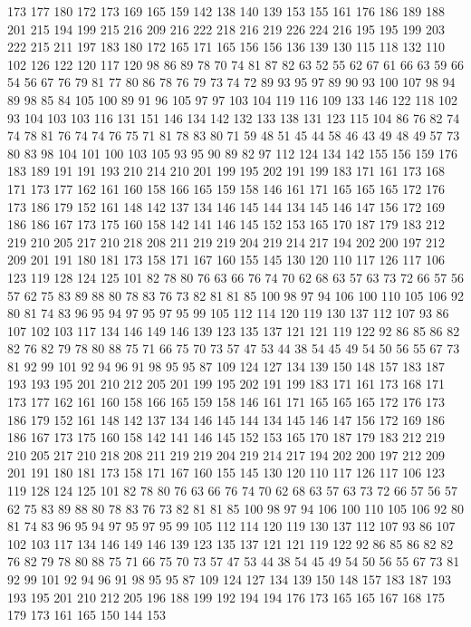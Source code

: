 173 177 180 172 173 169 165 159 142 138 140 139 153 155 161 176 186 189 188 201
215 194 199 215 216 209 216 222 218 216 219 226 224 216 195 195 199 203 222 215
211 197 183 180 172 165 171 165 156 156 136 139 130 115 118 132 110 102 126 122
120 117 120 98 86 89 78 70 74 81 87 82 63 52 55 62 67 61 66 63
59 66 54 56 67 76 79 81 77 80 86 78 76 79 73 74 72 89 93 95
97 89 90 93 100 107 98 94 89 98 85 84 105 100 89 91 96 105 97 97
103 104 119 116 109 133 146 122 118 102 93 104 103 103 116 131 151 146 134 142
132 133 138 131 123 115 104 86 76 82 74 74 78 81 76 74 74 76 75 71
81 78 83 80 71 59 48 51 45 44 58 46 43 49 48 49 57 73 80 83
98 104 101 100 103 105 93 95 90 89 82 97 112 124 134 142 155 156 159 176
183 189 191 191 193 210 214 210 201 199 195 202 191 199 183 171 161 173 168 171
173 177 162 161 160 158 166 165 159 158 146 161 171 165 165 165 172 176 173 186
179 152 161 148 142 137 134 146 145 144 134 145 146 147 156 172 169 186 186 167
173 175 160 158 142 141 146 145 152 153 165 170 187 179 183 212 219 210 205 217
210 218 208 211 219 219 204 219 214 217 194 202 200 197 212 209 201 191 180 181
173 158 171 167 160 155 145 130 120 110 117 126 117 106 123 119 128 124 125 101
82 78 80 76 63 66 76 74 70 62 68 63 57 63 73 72 66 57 56 57
62 75 83 89 88 80 78 83 76 73 82 81 81 85 100 98 97 94 106 100
110 105 106 92 80 81 74 83 96 95 94 97 95 97 95 99 105 112 114 120
119 130 137 112 107 93 86 107 102 103 117 134 146 149 146 139 123 135 137 121
121 119 122 92 86 85 86 82 82 76 82 79 78 80 88 75 71 66 75 70
73 57 47 53 44 38 54 45 49 54 50 56 55 67 73 81 92 99 101 92
94 96 91 98 95 95 87 109 124 127 134 139 150 148 157 183 187 193 193 195
201 210 212 205 201 199 195 202 191 199 183 171 161 173 168 171 173 177 162 161
160 158 166 165 159 158 146 161 171 165 165 165 172 176 173 186 179 152 161 148
142 137 134 146 145 144 134 145 146 147 156 172 169 186 186 167 173 175 160 158
142 141 146 145 152 153 165 170 187 179 183 212 219 210 205 217 210 218 208 211
219 219 204 219 214 217 194 202 200 197 212 209 201 191 180 181 173 158 171 167
160 155 145 130 120 110 117 126 117 106 123 119 128 124 125 101 82 78 80 76
63 66 76 74 70 62 68 63 57 63 73 72 66 57 56 57 62 75 83 89
88 80 78 83 76 73 82 81 81 85 100 98 97 94 106 100 110 105 106 92
80 81 74 83 96 95 94 97 95 97 95 99 105 112 114 120 119 130 137 112
107 93 86 107 102 103 117 134 146 149 146 139 123 135 137 121 121 119 122 92
86 85 86 82 82 76 82 79 78 80 88 75 71 66 75 70 73 57 47 53
44 38 54 45 49 54 50 56 55 67 73 81 92 99 101 92 94 96 91 98
95 95 87 109 124 127 134 139 150 148 157 183 187 193 193 195 201 210 212 205
196 188 199 192 194 194 176 173 165 165 167 168 175 179 173 161 165 150 144 153
